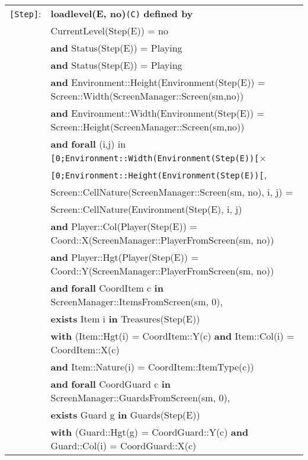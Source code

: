 \documentclass[7pt]{article}
\begin{document}
\begin{tabular}{rl}
       
       \texttt{[Step]}: & \textbf{loadlevel(E, no)}\texttt{(C)} \textbf{defined by} \\ 
&\quad\quad CurrentLevel(Step(E)) = no \\
&\quad\quad \textbf{and} Status(Step(E))  = Playing \\
&\quad\quad \textbf{and} Status(Step(E))  = Playing \\
&\quad\quad \textbf{and} Environment::Height(Environment(Step(E)) =  Screen::Width(ScreenManager::Screen(sm,no))\\
&\quad\quad \textbf{and} Environment::Width(Environment(Step(E)) = Screen::Height(ScreenManager::Screen(sm,no))\\
& \quad\quad \textbf{and}  {\textbf{forall}} (i,j) {in} \texttt{[0;Environment::Width(Environment(Step(E))[}× \\
& \quad\quad\quad\quad\quad\quad\quad\quad\quad\quad \texttt{[0;Environment::Height(Environment(Step(E))[}, \\
& \quad\quad\quad\quad Screen::CellNature(ScreenManager::Screen(sm, no), i, j) = \\ & \quad\quad \quad\quad \quad Screen::CellNature(Environment(Step(E), i, j) \\
& \quad\quad \textbf{and} Player::Col(Player(Step(E)) = Coord::X(ScreenManager::PlayerFromScreen(sm, no)) \\
& \quad\quad \textbf{and} Player::Hgt(Player(Step(E)) = Coord::Y(ScreenManager::PlayerFromScreen(sm, no)) \\
& \quad\quad \textbf{and} \textbf{forall} CoordItem c \textbf{in} ScreenManager::ItemsFromScreen(sm, 0), \\
& \quad\quad\quad\quad \textbf{exists} Item i \textbf{in} Treasures(Step(E)) \\
& \quad\quad\quad\quad\quad\quad \textbf{with} (Item::Hgt(i) = CoordItem::Y(c) \textbf{and} Item::Col(i) = CoordItem::X(c) \\
& \quad\quad\quad\quad\quad\quad\quad\quad \textbf{and} Item::Nature(i) = CoordItem::ItemType(c)) \\
&\quad\quad \textbf{and} \textbf{forall} CoordGuard c \textbf{in} ScreenManager::GuardsFromScreen(sm, 0), \\
& \quad\quad\quad\quad \textbf{exists} Guard g \textbf{in} Guards(Step(E)) \\
& \quad\quad\quad\quad\quad\quad \textbf{with} (Guard::Hgt(g) = CoordGuard::Y(c) \textbf{and} Guard::Col(i) = CoordGuard::X(c) \\

\end{tabular}
\end{document}
